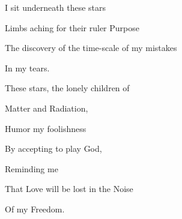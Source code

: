 \documentclass{article}
\begin{document}
\newline

I sit underneath these stars
\newline

Limbs aching for their ruler Purpose
\newline

The discovery of the time-scale of my mistakes
\newline

In my tears.
\newline

These stars, the lonely children of
\newline

Matter and Radiation, 
\newline

Humor my foolishness 
\newline

By accepting to play God,
\newline

Reminding me \newline

That Love will be lost in the Noise
\newline

Of my Freedom.
\newline
\end{document}
